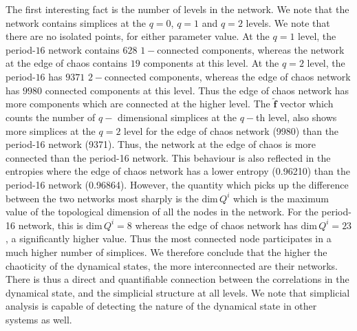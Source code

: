 \documentclass[aps,pre,superscriptaddress,groupedaddress,preprint]{revtex4}  %
\begin{document}
The first interesting fact is the number of levels in the network.
We note that the network contains simplices at the $q=0$, $q=1$ and $q=2$ levels.
We note that there are no isolated points, for either parameter value.
At the $q=1$ level, the period-$16$ network contains $628$ $1-$connected components, whereas the network at the edge of chaos contains $19$ components at this level.
At the $q=2$ level, the period-$16$ has $9371$ $2-$connected components, whereas the edge of chaos network has $9980$ connected components at this level.
Thus the edge of chaos network has more components which are connected at the higher level.
The $\mathbf{\tilde{f}}$ vector which counts the number of $q-$ dimensional simplices at the $q-$th level, also shows more simplices at the $q=2$ level for the edge of chaos network (9980) than the period-16 network (9371).
Thus, the network at the edge of chaos is more connected than the period-16 network.
This behaviour is also reflected in the entropies where the edge of chaos network has a lower entropy (0.96210) than the period-16 network (0.96864).
However, the quantity which picks up the difference between the two networks most sharply is the $\mathrm{dim}\, Q^{i}$ which is the maximum value of the topological dimension of all the nodes in the network.
For the period-16 network, this is $\mathrm{dim}\, Q^{i} = 8$ whereas the edge of chaos network has $\mathrm{dim}\, Q^{i}=23$, a significantly higher value.
Thus the most connected node participates in a much higher number of simplices.
We therefore conclude that the higher the chaoticity of the dynamical states, the more interconnected are their networks.
There is thus a direct and quantifiable connection between the correlations in the dynamical state, and the simplicial structure at all levels.
We note that simplicial analysis is capable of detecting the nature of the dynamical state in other systems as well.
\end{document}
